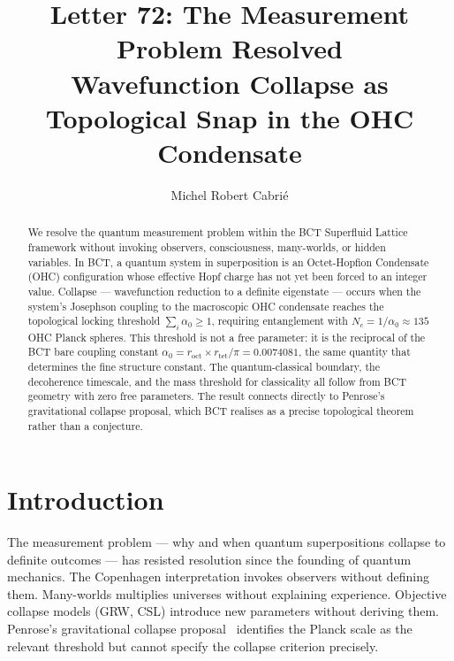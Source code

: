 \documentclass[aps,prl,twocolumn,superscriptaddress,showpacs]{revtex4-2}
\begin{document}
\title{Letter 72: The Measurement Problem Resolved\\
\large Wavefunction Collapse as Topological Snap in the OHC Condensate}

\author{Michel Robert Cabri\'{e}}

\begin{abstract}
We resolve the quantum measurement problem within the BCT Superfluid 
Lattice framework without invoking observers, consciousness, many-worlds, 
or hidden variables. In BCT, a quantum system in superposition is an 
Octet-Hopfion Condensate (OHC) configuration whose effective Hopf charge 
has not yet been forced to an integer value. Collapse --- wavefunction 
reduction to a definite eigenstate --- occurs when the system's Josephson 
coupling to the macroscopic OHC condensate reaches the topological locking 
threshold $\sum_i \alpha_0 \geq 1$, requiring entanglement with 
$N_c = 1/\alpha_0 \approx 135$ OHC Planck spheres. This threshold is not 
a free parameter: it is the reciprocal of the BCT bare coupling constant 
$\alpha_0 = r_\mathrm{oct}\times r_\mathrm{tet}/\pi = 0.0074081$, the 
same quantity that determines the fine structure constant. The 
quantum-classical boundary, the decoherence timescale, and the mass 
threshold for classicality all follow from BCT geometry with zero free 
parameters. The result connects directly to Penrose's gravitational 
collapse proposal, which BCT realises as a precise topological theorem 
rather than a conjecture.
\end{abstract}

\maketitle

\section{Introduction}

The measurement problem --- why and when quantum superpositions collapse 
to definite outcomes --- has resisted resolution since the founding of 
quantum mechanics. The Copenhagen interpretation invokes observers without 
defining them. Many-worlds multiplies universes without explaining 
experience. Objective collapse models (GRW, CSL) introduce new parameters 
without deriving them. Penrose's gravitational collapse proposal~\cite{Penrose1996} 
identifies the Planck scale as the relevant threshold but cannot specify 
the collapse criterion precisely.
\end{document}
